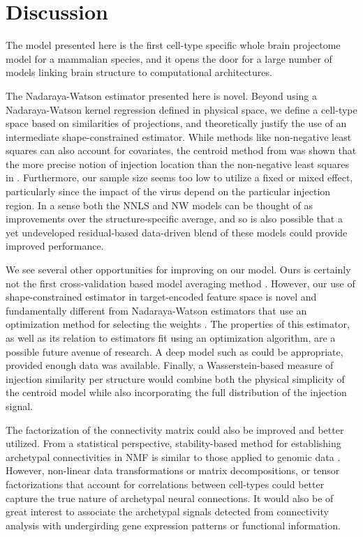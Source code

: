 \section{Discussion}

The model presented here is the first cell-type specific whole brain projectome model for a mammalian species, and it opens the door for a large number of models linking brain structure to computational architectures. 

The Nadaraya-Watson estimator presented here is novel.
Beyond using a Nadaraya-Watson kernel regression defined in physical space, we define a cell-type space based on similarities of projections, and theoretically justify the use of an intermediate shape-constrained estimator. 
While methods like non-negative least squares can also account for covariates, the centroid method from \citet{Knox2019-ot} was shown that the more precise notion of injection location than the non-negative least squares in \citet{Oh2014-kh}.
Furthermore, our sample size seems too low to utilize a fixed or mixed effect, particularly since the impact of the virus depend on the particular injection region.
In a sense both the NNLS and NW models can be thought of as improvements over the structure-specific average, and so is also possible that a yet undeveloped residual-based data-driven blend of these models could provide improved performance.

We see several other opportunities for improving on our model.
Ours is certainly not the first cross-validation based model averaging method \citet{Gao2016-qe}.
However, our use of shape-constrained estimator in target-encoded feature space is novel and fundamentally different from Nadaraya-Watson estimators that use an optimization method for selecting the weights \citep{Saul2003-th}.
The properties of this estimator, as well as its relation to estimators fit using an optimization algorithm, are a possible future avenue of research.
A deep model such as \citet{Lotfollahi2019-tr} could be appropriate, provided enough data was available.
Finally, a Wasserstein-based measure of injection similarity per structure would combine both the physical simplicity of the centroid model while also incorporating the full distribution of the injection signal.

The factorization of the connectivity matrix could also be improved and better utilized.
From a statistical perspective, stability-based method for establishing archetypal connectivities in NMF is similar to those applied to genomic data \cite{Wu2016-gg, Kotliar2019-yj}.
However, non-linear data transformations or matrix decompositions, or tensor factorizations that account for correlations between cell-types could better capture the true nature of archetypal neural connections.
It would also be of great interest to associate the archetypal signals detected from connectivity analysis with undergirding gene expression patterns or functional information.